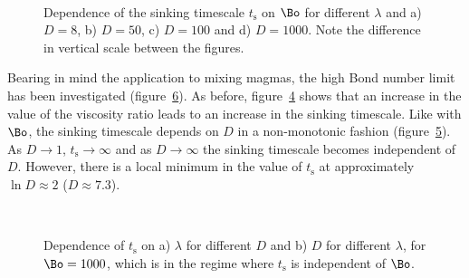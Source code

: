 {\begin{figure}
      \begin{subfigure}[b]{0.45\textwidth}
        \resizebox{\textwidth}{!}{\Large }
        \caption{}
        \label{fig:mdr=100_time}
      \end{subfigure}
      ~
      \begin{subfigure}[b]{0.45\textwidth}
        \resizebox{\textwidth}{!}{\Large }
        \caption{}
        \label{fig:mdr=1000_time}
      \end{subfigure}
      \caption{Dependence of the sinking timescale $t_{\text{s}}$ on $\Bo$ for different $\lambda$ and a) $D = 8$, b) $D = 50$, c) $D = 100$ and d) $D = 1000$. Note the difference in vertical scale between the figures.}\label{fig:mdr_time}
    \end{figure}

Bearing in mind the application to mixing magmas, the high Bond number limit has been investigated (figure~\ref{fig:highBo_time}). As before, figure~\ref{fig:time_viscos} shows that an increase in the value of the viscosity ratio leads to an increase in the sinking timescale. Like with $\Bo$, the sinking timescale depends on $D$ in a non-monotonic fashion (figure~\ref{fig:time_mdr}). As $D \to 1$, $t_{\text{s}} \to \infty$ and as $D \to \infty$ the sinking timescale becomes independent of $D$. However, there is a local minimum in the value of $t_{\text{s}}$ at approximately $\ln D \approx 2$ ($D \approx 7.3$).

    \begin{figure}
      \centering
      \begin{subfigure}[b]{0.45\textwidth}
        \resizebox{\textwidth}{!}{\Large }
        \caption{}
        \label{fig:time_viscos}
      \end{subfigure}
      ~
      \begin{subfigure}[b]{0.45\textwidth}
        \resizebox{\textwidth}{!}{\Large }
        \caption{}
        \label{fig:time_mdr}
      \end{subfigure}
      \caption{Dependence of $t_{\text{s}}$ on a) $\lambda$ for different $D$ and b) $D$ for different $\lambda$, for $\Bo = 1000$, which is in the regime where $t_{\text{s}}$ is independent of $\Bo$.}\label{fig:highBo_time}
    \end{figure}

}
